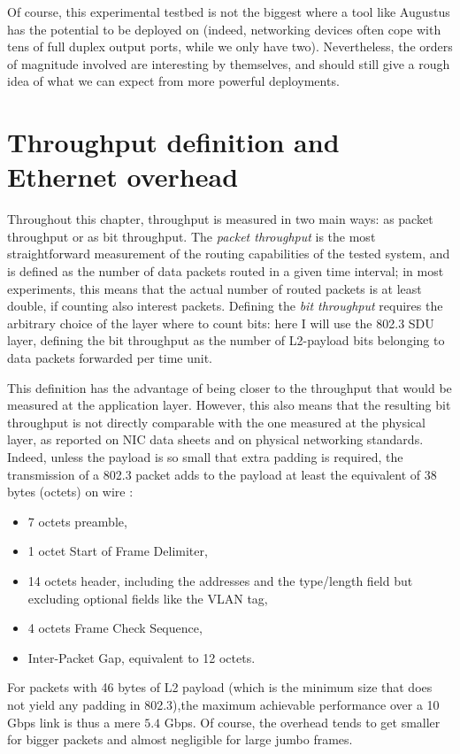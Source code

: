 \documentclass[11pt,a4paper,twoside,titlepage,openany]{book}
\begin{document}
Of course, this experimental testbed is not the biggest where a tool like Augustus has the potential to be deployed on (indeed, networking devices often cope with tens of full duplex output ports, while we only have two). Nevertheless, the orders of magnitude involved are interesting by themselves, and should still give a rough idea of what we can expect from more powerful deployments.

\section{Throughput definition and Ethernet overhead}\label{sec:test.overhead}
Throughout this chapter, throughput is measured in two main ways: as packet throughput or as bit throughput.
The \emph{packet throughput} is the most straightforward measurement of the routing capabilities of the tested system, and is defined as the number of data packets routed in a given time interval; in most experiments, this means that the actual number of routed packets is at least double, if counting also interest packets.
Defining the \emph{bit throughput} requires the arbitrary choice of the layer where to count bits: here I will use the 802.3 \gls{SDU} layer, defining the bit throughput as the number of L2-payload bits belonging to data packets forwarded per time unit.

This definition has the advantage of being closer to the throughput that would be measured at the application layer. However, this also means that the resulting bit throughput is not directly comparable with the one measured at the physical layer, as reported on NIC data sheets and on physical networking standards.
Indeed, unless the payload is so small that extra padding is required, the transmission of a 802.3 packet adds to the payload at least the equivalent of 38 bytes (octets) on wire \cite{ethernet}:
\begin{itemize}[noitemsep,nolistsep]
\item 7 octets preamble,
\item 1 octet Start of Frame Delimiter,
\item 14 octets header, including the addresses and the type/length field but excluding optional fields like the VLAN tag,
\item 4 octets Frame Check Sequence,
\item Inter-Packet Gap, equivalent to 12 octets.
\end{itemize}
For packets with 46 bytes of L2 payload (which is the minimum size that does not yield any padding in 802.3),the maximum achievable performance over a 10 Gbps link is thus a mere $5.4$ Gbps. Of course, the overhead tends to get smaller for bigger packets and almost negligible for large jumbo frames.
\end{document}
